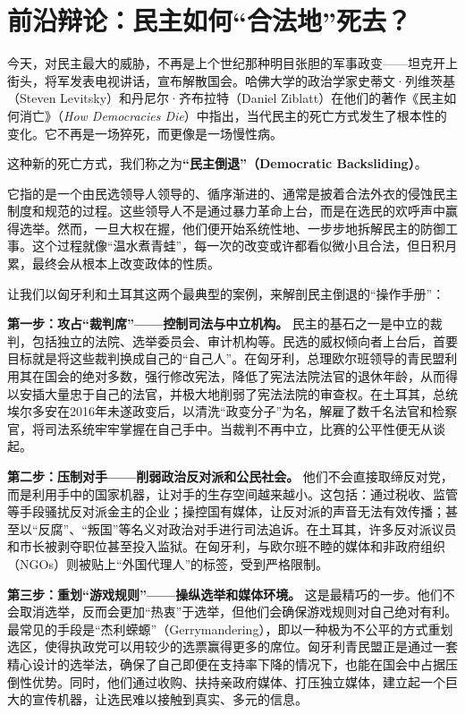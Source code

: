 \documentclass[a5paper, 11pt, openany]{ctexbook}
\begin{document}
\section{前沿辩论：民主如何“合法地”死去？}

今天，对民主最大的威胁，不再是上个世纪那种明目张胆的军事政变——坦克开上街头，将军发表电视讲话，宣布解散国会。哈佛大学的政治学家史蒂文·列维茨基（Steven Levitsky）和丹尼尔·齐布拉特（Daniel Ziblatt）在他们的著作《民主如何消亡》（\textit{How Democracies Die}）中指出，当代民主的死亡方式发生了根本性的变化。它不再是一场猝死，而更像是一场慢性病。

这种新的死亡方式，我们称之为\textbf{“民主倒退”（Democratic Backsliding）}。

它指的是一个由民选领导人领导的、循序渐进的、通常是披着合法外衣的侵蚀民主制度和规范的过程。这些领导人不是通过暴力革命上台，而是在选民的欢呼声中赢得选举。然而，一旦大权在握，他们便开始系统性地、一步步地拆解民主的防御工事。这个过程就像“温水煮青蛙”，每一次的改变或许都看似微小且合法，但日积月累，最终会从根本上改变政体的性质。

让我们以匈牙利和土耳其这两个最典型的案例，来解剖民主倒退的“操作手册”：

\textbf{第一步：攻占“裁判席”——控制司法与中立机构。}
民主的基石之一是中立的裁判，包括独立的法院、选举委员会、审计机构等。民选的威权倾向者上台后，首要目标就是将这些裁判换成自己的“自己人”。在匈牙利，总理欧尔班领导的青民盟利用其在国会的绝对多数，强行修改宪法，降低了宪法法院法官的退休年龄，从而得以安插大量忠于自己的法官，并极大地削弱了宪法法院的审查权。在土耳其，总统埃尔多安在2016年未遂政变后，以清洗“政变分子”为名，解雇了数千名法官和检察官，将司法系统牢牢掌握在自己手中。当裁判不再中立，比赛的公平性便无从谈起。

\textbf{第二步：压制对手——削弱政治反对派和公民社会。}
他们不会直接取缔反对党，而是利用手中的国家机器，让对手的生存空间越来越小。这包括：通过税收、监管等手段骚扰反对派金主的企业；操控国有媒体，让反对派的声音无法有效传播；甚至以“反腐”、“叛国”等名义对政治对手进行司法追诉。在土耳其，许多反对派议员和市长被剥夺职位甚至投入监狱。在匈牙利，与欧尔班不睦的媒体和非政府组织（NGOs）则被贴上“外国代理人”的标签，受到严格限制。

\textbf{第三步：重划“游戏规则”——操纵选举和媒体环境。}
这是最精巧的一步。他们不会取消选举，反而会更加“热衷”于选举，但他们会确保游戏规则对自己绝对有利。最常见的手段是“杰利蝾螈”（Gerrymandering），即以一种极为不公平的方式重划选区，使得执政党可以用较少的选票赢得更多的席位。匈牙利青民盟正是通过一套精心设计的选举法，确保了自己即便在支持率下降的情况下，也能在国会中占据压倒性优势。同时，他们通过收购、扶持亲政府媒体、打压独立媒体，建立起一个巨大的宣传机器，让选民难以接触到真实、多元的信息。
\end{document}
